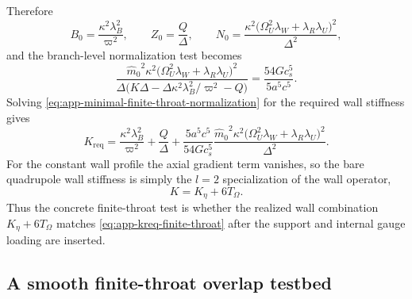 \documentclass[11pt]{article}
\theoremstyle{definition}
\newcommand{\mhat}{\ensuremath{\hat m_0}}
\begin{document}
Therefore
\begin{equation}
 B_0=\frac{\kappa^2\lambda_B^2}{\varpi^2},
 \qquad
 Z_0=\frac{Q}{\Delta},
 \qquad
 N_0=\frac{\kappa^2\bigl(\Omega_U^2\lambda_W+\lambda_R\lambda_U\bigr)^2}{\Delta^2},
 \label{eq:app-minimal-finite-throat-b0z0n0}
\end{equation}
and the branch-level normalization test becomes
\begin{equation}
 \frac{\mhat^2\kappa^2\bigl(\Omega_U^2\lambda_W+\lambda_R\lambda_U\bigr)^2}{\Delta\bigl(K\Delta-\Delta\kappa^2\lambda_B^2/\varpi^2-Q\bigr)}
 =
 \frac{54Gc_s^5}{5a^5c^5}.
 \label{eq:app-minimal-finite-throat-normalization}
\end{equation}
Solving \eqref{eq:app-minimal-finite-throat-normalization} for the required wall stiffness gives
\begin{equation}
 K_{\mathrm{req}}
 =
 \frac{\kappa^2\lambda_B^2}{\varpi^2}
 +
 \frac{Q}{\Delta}
 +
 \frac{5a^5c^5}{54Gc_s^5}
 \frac{\mhat^2\kappa^2\bigl(\Omega_U^2\lambda_W+\lambda_R\lambda_U\bigr)^2}{\Delta^2}.
 \label{eq:app-kreq-finite-throat}
\end{equation}
For the constant wall profile the axial gradient term vanishes, so the bare quadrupole wall stiffness is simply the $l=2$ specialization of the wall operator,
\begin{equation}
 K = K_\eta + 6T_\Omega.
 \label{eq:app-k-l2-wall}
\end{equation}
Thus the concrete finite-throat test is whether the realized wall combination $K_\eta+6T_\Omega$ matches \eqref{eq:app-kreq-finite-throat} after the support and internal gauge loading are inserted.

\subsection{A smooth finite-throat overlap testbed}
\end{document}
